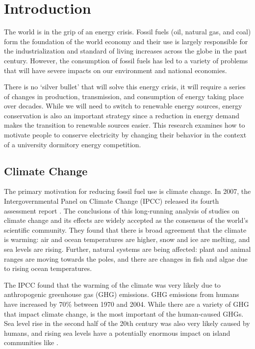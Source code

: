 \chapter{Introduction}

The world is in the grip of an energy crisis. Fossil fuels (oil, natural gas, and coal) form the foundation of the world economy and their use is largely responsible for the industrialization and standard of living increases across the globe in the past century. However, the consumption of fossil fuels has led to a variety of problems that will have severe impacts on our environment and national economies.

There is no `silver bullet' that will solve this energy crisis, it will require a series of changes in production, transmission, and consumption of energy taking place over decades. While we will need to switch to renewable energy sources, energy conservation is also an important strategy since a reduction in energy demand makes the transition to renewable sources easier. This research examines how to motivate people to conserve electricity by changing their behavior in the context of a university dormitory energy competition.


\section{Climate Change}
\label{sec:motivation}

The primary motivation for reducing fossil fuel use is climate change. In 2007, the Intergovernmental Panel on Climate Change (IPCC) released its fourth assessment report \cite{IPCC-synthesis-report-2007}. The conclusions of this long-running analysis of studies on climate change and its effects are widely accepted as the consensus of the world's scientific community. They found that there is broad agreement that the climate is warming: air and ocean temperatures are higher, snow and ice are melting, and sea levels are rising. Further, natural systems are being affected: plant and animal ranges are moving towards the poles, and there are changes in fish and algae due to rising ocean temperatures.

The IPCC found that the warming of the climate was very likely due to anthropogenic greenhouse gas (GHG) emissions. GHG emissions from humans have increased by 70\% between 1970 and 2004. While there are a variety of GHG that impact climate change, \COtwo is the most important of the human-caused GHGs. Sea level rise in the second half of the 20th century was also very likely caused by humans, and rising sea levels have a potentially enormous impact on island communities like \Hawaii.

